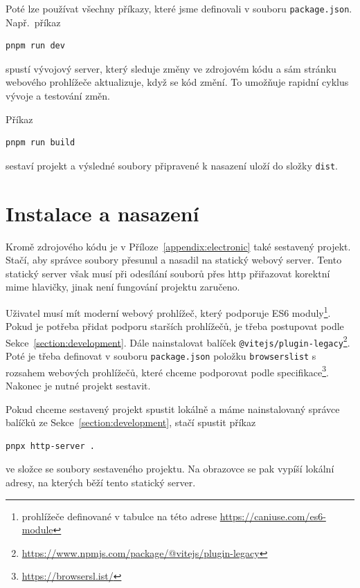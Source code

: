 Poté lze používat všechny příkazy, které jsme definovali v souboru \texttt{package.json}.
Např.~příkaz
\begin{verbatim}
pnpm run dev
\end{verbatim}
spustí vývojový server, který sleduje změny ve zdrojovém kódu a sám stránku webového prohlížeče aktualizuje, když se kód změní.
To umožňuje rapidní cyklus vývoje a testování změn.

Příkaz
\begin{verbatim}
pnpm run build
\end{verbatim}
sestaví projekt a výsledné soubory připravené k nasazení uloží do složky \texttt{dist}.

\section{Instalace a nasazení}

Kromě zdrojového kódu je v Příloze~\ref{appendix:electronic} také sestavený projekt.
Stačí, aby správce soubory přesunul a nasadil na statický webový server.
Tento statický server však musí při odesílání souborů přes \acrshort{http} přiřazovat korektní \acrshort{mime} hlavičky, jinak není fungování projektu zaručeno.

Uživatel musí mít moderní webový prohlížeč, který podporuje ES6 moduly\footnote{prohlížeče definované v tabulce na této adrese \url{https://caniuse.com/es6-module}}.
Pokud je potřeba přidat podporu starších prohlížečů, je třeba postupovat podle Sekce~\ref{section:development}.
Dále nainstalovat balíček \texttt{@vitejs/plugin-legacy}\footnote{\url{https://www.npmjs.com/package/@vitejs/plugin-legacy}}.
Poté je třeba definovat v souboru \texttt{package.json} položku \texttt{browserslist} s rozsahem webových prohlížečů, které chceme podporovat podle specifikace\footnote{\url{https://browsersl.ist/}}.
Nakonec je nutné projekt sestavit.

Pokud chceme sestavený projekt spustit lokálně a máme nainstalovaný správce balíčků ze Sekce~\ref{section:development}, stačí spustit příkaz
\begin{verbatim}
pnpx http-server .
\end{verbatim}
ve složce se soubory sestaveného projektu.
Na obrazovce se pak vypíší lokální adresy, na kterých běží tento statický server.
